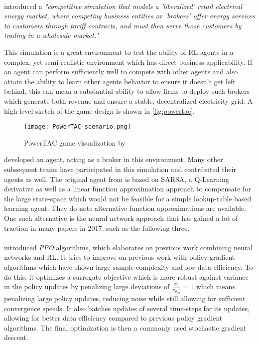 \documentclass[12pt,a4paper]{article}
\begin{document}
\paragraph{\citeauthor{ketter2016powertac}} introduced a \emph{"competitive simulation that models a 'liberalized' retail electrical energy market,
where competing business entities or 'brokers' offer energy services to customers through tariff
contracts, and must then serve those customers by trading in a wholesale market."}

This simulation is a great environment to test the ability of \ac{RL} agents in a complex, yet semi-realistic environment which has direct business-applicability. If an agent can perform sufficiently well to compete with other agents and also attain the ability to learn other agents behavior to ensure it doesn't get left behind, this can mean a substantial ability to allow firms to deploy such brokers which generate both revenue and ensure a stable, decentralized electricity grid. A high-level sketch of the game design is shown in \autoref{fig:powertac}.

\begin{figure}[]
    \centering
    \texttt{[image: PowerTAC-scenario.png]}
    \caption{PowerTAC game visualization by \cite{ketter2016powertac}}
    \label{fig:powertac}
\end{figure}

\citeauthor{peters2013reinforcement} developed an agent, acting as a broker in this environment. Many other subsequent teams have participated in this simulation and contributed their agents as well. The original agent from \cite{peters2013reinforcement} is based on SARSA, a Q-Learning derivative as well as a linear function approximation approach to compensate for the large state-space which would not be feasible for a simple lookup-table based learning agent. They do note alternative function approximations are available. One such alternative is the neural network approach that has gained a lot of traction in many papers in 2017, such as the following three.

\paragraph{\citeauthor{proximalpolicyopt}} introduced \emph{\acf{PPO}} algorithms, which elaborates on previous work combining neural networks and \ac{RL}. It tries to improve on previous work with policy gradient algorithms which have shown large sample complexity and low data efficiency. To do this, it optimizes a surrogate objective which is more robust against variance in the policy updates by penalizing large deviations of $\frac{\pi_\theta}{\pi_{\theta_{old}}} = 1$ which means penalizing large policy updates, reducing noise while still allowing for sufficient convergence speeds. It also batches updates of several time-steps for its updates, allowing for better data efficiency compared to previous policy gradient algorithms. The final optimization is then a commonly used stochastic gradient descent.
\end{document}
